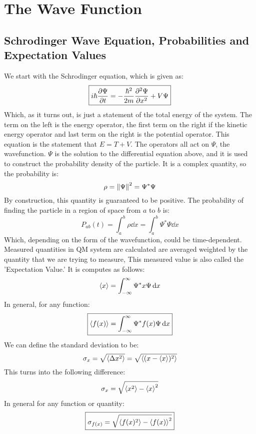 \section{The Wave Function}
\subsection{Schrodinger Wave Equation, Probabilities and Expectation Values}
We start with the Schrodinger equation, which is given as:
\begin{equation*}
 \boxed{ i\hbar\pdv{\Psi}{t}=-\dfrac{\hbar^2}{2m}\pdv[2]{\Psi}{x}+V\Psi}
\end{equation*}
Which, as it turns out, is just a statement of the total energy of the system. The term on the left is the energy operator, the first term on the right if the kinetic energy operator and last term on the right is the potential operator. This equation is the statement that $E = T + V$. The operators all act on $\Psi$, the wavefunction. $\Psi$ is the solution to the differential equation above, and it is used to construct the probability density of the particle. It is a complex quantity, so the probability is:
\begin{equation*}
  \rho=\norm{\Psi}^2=\Psi^*\Psi
\end{equation*}
By construction, this quantity is guaranteed to be positive. The probability of finding the particle in a region of space from $a$ to $b$ is:
\begin{equation*}
  \boxed{P_{ab}(t)=\int_a^b\rho\dd{x}=\int_a^b\Psi^*\Psi\dd{x}}
\end{equation*}
Which, depending on the form of the wavefunction, could be time-dependent. Measured quantities in QM system are calculated are averaged weighted by the quantity that we are trying to measure, This measured value is also called the 'Expectation Value.' It is computes as follows:
\begin{equation*}
  \ev{x}=\int_{-\infty}^{\infty}\Psi^*x\Psi\dd{x}
\end{equation*}
In general, for any function:
\begin{equation*}
 \boxed{ \ev{f(x)}=\int_{-\infty}^{\infty}\Psi^*f(x)\Psi\dd{x}}
\end{equation*}
We can define the standard deviation to be:
\begin{equation*}
  \sigma_x=\sqrt{\ev{\Delta{x}^2}}=\sqrt{\ev{(x-\ev{x})^2}}
\end{equation*}
This turns into the following difference:
\begin{equation*}
  \sigma_x=\sqrt{\ev{x^2}-\ev{x}^2}
\end{equation*}
In general for any function or quantity:
\begin{equation*}
 \boxed{ \sigma_{f(x)}=\sqrt{\ev{f(x)^2}-\ev{f(x)}^2}}
\end{equation*}

